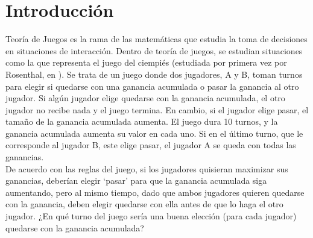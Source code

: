 
\chapter{Introducción} %

\label{Chapter1} %


\newcommand{\keyword}[1]{\textbf{#1}}
\newcommand{\tabhead}[1]{\textbf{#1}}
\newcommand{\code}[1]{\texttt{#1}}
\newcommand{\file}[1]{\texttt{\bfseries#1}}
\newcommand{\option}[1]{\texttt{\itshape#1}}


Teoría de Juegos es la rama de las matemáticas que estudia la toma de decisiones en situaciones de interacción. Dentro de teoría de juegos, se estudian situaciones como la que representa el juego del ciempiés (estudiada por primera vez por Rosenthal, en \citeyear{Rosenthal}). Se trata de un juego donde dos jugadores, A y B, toman turnos para elegir si quedarse con una ganancia acumulada o pasar la ganancia al otro jugador. Si algún jugador elige quedarse con la ganancia acumulada, el otro jugador no recibe nada y el juego termina. En cambio, si el jugador elige pasar, el tamaño de la ganancia acumulada aumenta. El juego dura 10 turnos, y la ganancia acumulada aumenta su valor en cada uno. Si en el último turno, que le corresponde al jugador B, este elige pasar, el jugador A se queda con todas las ganancias.\\

De acuerdo con las reglas del juego, si los jugadores quisieran maximizar sus ganancias, deberían elegir ‘pasar’ para que la ganancia acumulada siga aumentando, pero al mismo tiempo, dado que ambos jugadores quieren quedarse con la ganancia, deben elegir quedarse con ella antes de que lo haga el otro jugador. ¿En qué turno del juego sería una buena elección (para cada jugador) quedarse con la ganancia acumulada?\\

